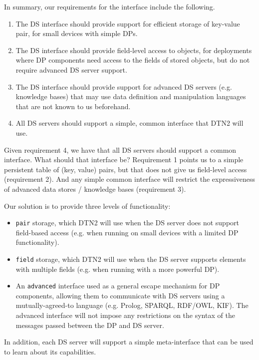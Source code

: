 In summary, our requirements for the interface include the following.

\begin{enumerate}
\item The DS interface should provide support for efficient storage of 
key-value pair, for small devices with simple DPs. 
\item The DS interface should provide field-level access to
objects, for deployments where DP components need access to the
fields of stored objects, but do not require advanced DS server
support. 
\item The DS interface should provide support for advanced
DS servers (e.g. knowledge bases) that may use data
definition and manipulation languages that are not known to us beforehand.
\item All DS servers should support a simple, common interface
that DTN2 will use. 
\end{enumerate}

Given requirement 4, we have that all DS servers should
support a common interface. What should that interface be? Requirement
1 points us to a simple persistent table of (key, value) pairs, but that
does not give us field-level access (requirement 2). And any simple
common interface will restrict the expressiveness of advanced data
stores / knowledge bases (requirement 3).

Our solution is to provide three levels of functionality:

\begin{itemize}
\item {\tt pair} storage, which DTN2 will use when the
DS server does not support field-based access (e.g. when running on
small devices with a limited DP functionality).
\item {\tt field} storage, which DTN2 will use when the DS
server supports elements with multiple fields (e.g. when running
with a more powerful DP). 
\item An  {\tt advanced} interface used as a general escape
mechanism for DP components, allowing them to communicate with DS
servers using a mutually-agreed-to language (e.g. Prolog, SPARQL,
RDF/OWL, KIF). The advanced interface will not impose any
restrictions on the syntax of the messages passed between the DP and
DS server.
\end{itemize}

In addition, each DS server will support a simple meta-interface that
can be used to learn about its capabilities.

